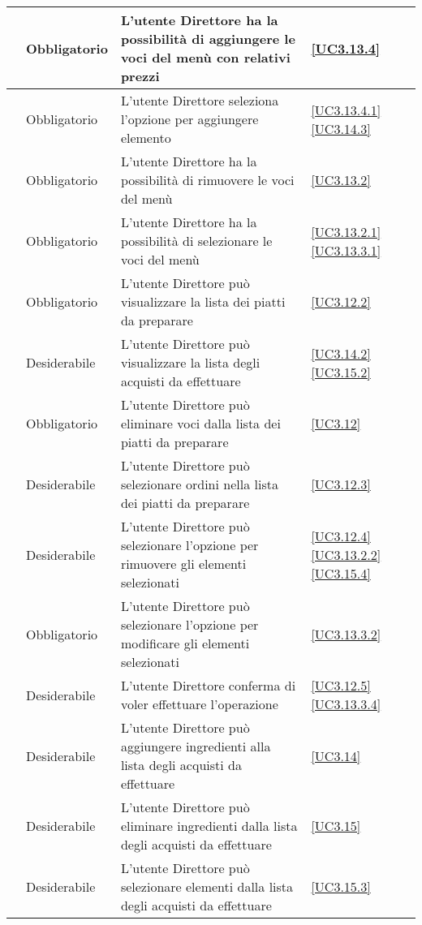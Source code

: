 \begin{longtable}{|P{1.5cm}|P{2.5cm}|P{6.5cm}|P{2.5cm}|}
	\hline \RequisitoObF\label{L79} & Obbligatorio & L'utente Direttore ha la possibilità di aggiungere le voci del menù con relativi prezzi & \ref{UC3.13.4} \\
	\hline \RequisitoObF\label{L108} & Obbligatorio & L'utente Direttore seleziona l'opzione per aggiungere elemento & \ref{UC3.13.4.1} \ref{UC3.14.3}\\
	\hline \RequisitoObF\label{L80} & Obbligatorio & L'utente Direttore ha la possibilità di rimuovere le voci del menù & \ref{UC3.13.2} \\
	\hline \RequisitoObF\label{L106} & Obbligatorio & L'utente Direttore ha la possibilità di selezionare le voci del menù & \ref{UC3.13.2.1} \ref{UC3.13.3.1} \\
	\hline \RequisitoObF\label{L30} & Obbligatorio & L'utente Direttore può visualizzare la lista dei piatti da preparare & \ref{UC3.12.2} \\
	\hline \RequisitoDF\label{L31} & Desiderabile & L'utente Direttore può visualizzare la lista degli acquisti da effettuare & \ref{UC3.14.2} \ref{UC3.15.2} \\
	\hline \RequisitoObF\label{L32} & Obbligatorio & L'utente Direttore può eliminare voci dalla lista dei piatti da preparare & \ref{UC3.12} \\
	\hline \RequisitoDF\label{L101} & Desiderabile & L'utente Direttore può selezionare ordini nella lista dei piatti da preparare & \ref{UC3.12.3} \\
	\hline \RequisitoDF\label{L102} & Desiderabile & L'utente Direttore può selezionare l'opzione per rimuovere gli elementi selezionati & \ref{UC3.12.4} \ref{UC3.13.2.2} \ref{UC3.15.4}\\
	\hline \RequisitoObF\label{L107} & Obbligatorio & L'utente Direttore può selezionare l'opzione per modificare gli elementi selezionati & \ref{UC3.13.3.2} \\
	\hline \RequisitoDF\label{L103} & Desiderabile & L'utente Direttore conferma di voler effettuare l'operazione & \ref{UC3.12.5} \ref{UC3.13.3.4} \\
	\hline \RequisitoDF\label{L53} & Desiderabile & L'utente Direttore può aggiungere ingredienti alla lista degli acquisti da effettuare & \ref{UC3.14}\\
	 \hline \RequisitoDF\label{L65} & Desiderabile & L'utente Direttore può eliminare ingredienti dalla lista degli acquisti da effettuare & \ref{UC3.15} \\
	\hline \RequisitoDF\label{L109} & Desiderabile & L'utente Direttore può selezionare elementi dalla lista degli acquisti da effettuare & \ref{UC3.15.3} \\

\end{longtable}
